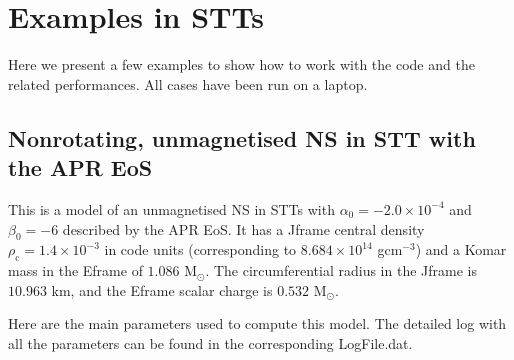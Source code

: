 \documentclass[letterpaper,10pt,english]{sphinxmanual}
\begin{document}
\chapter{Examples in STTs}
\label{\detokenize{examples_stt:examples-in-stts}}\label{\detokenize{examples_stt::doc}}
\sphinxAtStartPar
Here we present a few examples to show how to work with the code and the related performances. All
cases have been run on a laptop.


\section{Non\sphinxhyphen{}rotating, unmagnetised NS in STT with the APR EoS}
\label{\detokenize{examples_stt:non-rotating-unmagnetised-ns-in-stt-with-the-apr-eos}}
\sphinxAtStartPar
This is a model of an unmagnetised NS in STTs with \(\alpha _0 = -2.0\times 10^{-4}\) and \(\beta _0 = -6\) described by the APR EoS. It has a J\sphinxhyphen{}frame central density \(\rho _\mathrm{c}=1.4\times 10^{-3}\) in code units (corresponding to \(8.684\times 10^{14}\) gcm\(^{-3}\)) and a Komar mass in the E\sphinxhyphen{}frame of \(1.086\) M\( _\odot\). The circumferential radius in the J\sphinxhyphen{}frame is \(10.963\) km, and the E\sphinxhyphen{}frame scalar charge is \(0.532\) M\( _\odot\).

\sphinxAtStartPar
Here are the main parameters used to compute this model. The detailed log with all the parameters can be found in the corresponding LogFile.dat.

\begin{sphinxVerbatim}[commandchars=\\\{\}]
                    
                 
              
              
\end{sphinxVerbatim}
\end{document}
